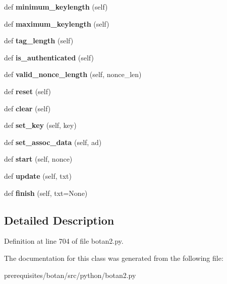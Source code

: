 \begin{DoxyCompactItemize}
def {\bfseries minimum\+\_\+keylength} (self)
\item 
\mbox{\label{classbotan2_1_1_symmetric_cipher_a42e44fbfcf38af965e5f24a55dfe4960}} 
def {\bfseries maximum\+\_\+keylength} (self)
\item 
\mbox{\label{classbotan2_1_1_symmetric_cipher_a473f595032fb2c793518894ce9a18136}} 
def {\bfseries tag\+\_\+length} (self)
\item 
\mbox{\label{classbotan2_1_1_symmetric_cipher_a42a5cdb487f00bcce4056d9a411e721d}} 
def {\bfseries is\+\_\+authenticated} (self)
\item 
\mbox{\label{classbotan2_1_1_symmetric_cipher_a69f72786886afbb1e44dfb7cf8bb73bb}} 
def {\bfseries valid\+\_\+nonce\+\_\+length} (self, nonce\+\_\+len)
\item 
\mbox{\label{classbotan2_1_1_symmetric_cipher_a80d0be9866258505f55c12c21caedac8}} 
def {\bfseries reset} (self)
\item 
\mbox{\label{classbotan2_1_1_symmetric_cipher_ab60833403b1c17c9ffab2480d44204c6}} 
def {\bfseries clear} (self)
\item 
\mbox{\label{classbotan2_1_1_symmetric_cipher_a5447b1a81ebe91f447d25389184e16a0}} 
def {\bfseries set\+\_\+key} (self, key)
\item 
\mbox{\label{classbotan2_1_1_symmetric_cipher_aaeede15b9f9864660caa2a32d84e4e2b}} 
def {\bfseries set\+\_\+assoc\+\_\+data} (self, ad)
\item 
\mbox{\label{classbotan2_1_1_symmetric_cipher_ab6b45b60fcbb9d54ea5d9e67ddd5ef8f}} 
def {\bfseries start} (self, nonce)
\item 
\mbox{\label{classbotan2_1_1_symmetric_cipher_a72bea84810ea66610888f508ce96884c}} 
def {\bfseries update} (self, txt)
\item 
\mbox{\label{classbotan2_1_1_symmetric_cipher_aff951a3dacac81ac603c2464fd878772}} 
def {\bfseries finish} (self, txt=None)
\end{DoxyCompactItemize}


\subsection{Detailed Description}


Definition at line 704 of file botan2.\+py.



The documentation for this class was generated from the following file\+:\begin{DoxyCompactItemize}
\item 
prerequisites/botan/src/python/botan2.\+py\end{DoxyCompactItemize}
